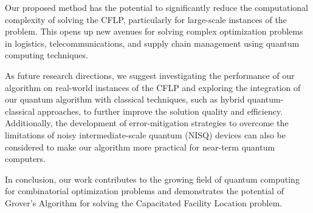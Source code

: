 Our proposed method has the potential to significantly reduce the computational complexity of solving the CFLP, particularly for large-scale instances of the problem. This opens up new avenues for solving complex optimization problems in logistics, telecommunications, and supply chain management using quantum computing techniques.

As future research directions, we suggest investigating the performance of our algorithm on real-world instances of the CFLP and exploring the integration of our quantum algorithm with classical techniques, such as hybrid quantum-classical approaches, to further improve the solution quality and efficiency. Additionally, the development of error-mitigation strategies to overcome the limitations of noisy intermediate-scale quantum (NISQ) devices can also be considered to make our algorithm more practical for near-term quantum computers.

In conclusion, our work contributes to the growing field of quantum computing for combinatorial optimization problems and demonstrates the potential of Grover's Algorithm for solving the Capacitated Facility Location problem.


